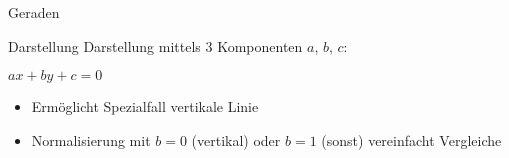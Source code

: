 \begin{frame}{Geraden}
	\begin{block}{Darstellung}
		Darstellung mittels 3 Komponenten $a$, $b$, $c$:
		\begin{center}
			$ax + by + c = 0$
		\end{center}
	\end{block}
	\begin{itemize}
		\item Ermöglicht Spezialfall vertikale Linie
		\item Normalisierung mit $b = 0$ (vertikal) oder $b = 1$ (sonst) vereinfacht Vergleiche
	\end{itemize}
\end{frame}
